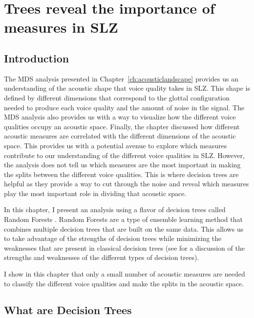 \chapter{Trees reveal the importance of measures in SLZ} \label{ch:revealing_trees}

\section{Introduction} \label{sec:bagging_intro}

The MDS analysis presented in Chapter~\ref{ch:acousticlandscape} provides us an understanding of the acoustic shape that voice quality takes in SLZ. This shape is defined by different dimensions that correspond to the glottal configuration needed to produce each voice quality and the amount of noise in the signal. The MDS analysis also provides us with a way to visualize how the different voice qualities occupy an acoustic space. Finally, the chapter discussed how different acoustic measures are correlated with the different dimensions of the acoustic space. This provides us with a potential avenue to explore which measures contribute to our understanding of the different voice qualities in SLZ.
However, the analysis does not tell us which measures are the most important in making the splits between the different voice qualities. This is where decision trees are helpful as they provide a way to cut through the noise and reveal which measures play the most important role in dividing that acoustic space. 

In this chapter, I present an analysis using a flavor of decision trees called Random Forests \citep{breimanClassificationRegressionTrees1986,breimanRandomForests2001}. Random Forests are a type of ensemble learning method that combines multiple decision trees that are built on the same data. This allows us to take advantage of the strengths of decision trees while minimizing the weaknesses that are present in classical decision trees (see \cite{hastieElementsStatisticalLearning2009,boehmkeHandsOnMachineLearning2019,jamesIntroductionStatisticalLearning2021} for a discussion of the strengths and weaknesses of the different types of decision trees).

I show in this chapter that only a small number of acoustic measures are needed to classify the different voice qualities and make the splits in the acoustic space. 

\section{What are Decision Trees} \label{sec:what_are_dt}

